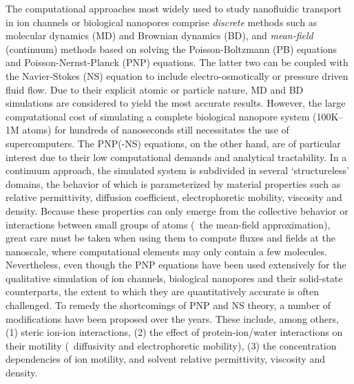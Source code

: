 \documentclass[twoside,twocolumn,9pt]{article}
\begin{document}
The computational approaches most widely used to study nanofluidic transport in ion channels or biological
nanopores comprise \emph{discrete} methods such as molecular dynamics
(MD)\cite{Lynden-Bell-1996,Allen-1999,Aksimentiev-2005,Luan-2008,Bhattacharya-2011,Zhang-2014,DiMarino-2015,Belkin-2016}
and Brownian dynamics
(BD),\cite{Schirmer-1999,Im-2002,Noskov-2004,Millar-2008,Egwolf-2010,DeBiase-2015,Pederson-2015} and
\emph{mean-field} (continuum) methods based on solving the Poisson-Boltzmann (PB)
equations\cite{Grochowski-2008, Baldessari-2008-1} and Poisson-Nernst-Planck (PNP)
equations.\cite{Eisenberg-1996,Gillespie-2002, Simakov-2010} The latter two can be coupled with the
Navier-Stokes (NS) equation to include electro-osmotically or pressure driven fluid
flow.\cite{Lu-2012,Pederson-2015} Due to their explicit atomic or particle nature, MD and BD simulations are
considered to yield the most accurate results. However, the large computational cost of simulating a complete
biological nanopore system (100K--1M atoms) for hundreds of nanoseconds still necessitates the use of
supercomputers.\cite{Aksimentiev-2005,Bhattacharya-2011,Wilson-2019} The PNP(-NS) equations, on the other
hand, are of particular interest due to their low computational demands and analytical tractability. In a
continuum approach, the simulated system is subdivided in several `structureless' domains, the behavior of
which is parameterized by material properties such as relative permittivity, diffusion coefficient,
electrophoretic mobility, viscosity and density. Because these properties can only emerge from the collective
behavior or interactions between small groups of atoms (\ie~the mean-field approximation), great care must be
taken when using them to compute fluxes and fields at the nanoscale, where computational elements may only
contain a few molecules.\cite{Corry-2000,Collins-2012} Nevertheless, even though the PNP equations have been
used extensively for the qualitative simulation of ion channels,\cite{Im-2002,Furini-2006,Liu-2015} biological
nanopores\cite{Simakov-2010,Pederson-2015,Aguilella-Arzo-2017,Simakov-2018} and their solid-state
counterparts,\cite{Cervera-2005,White-2008,Chaudhry-2014,Laohakunakorn-2015} the extent to which they are
quantitatively accurate is often challenged.\cite{Corry-2000,Collins-2012,Maffeo-2012,Thomas-2014,Kim-2015}
To remedy the shortcomings of PNP and NS theory, a number of modifications have been proposed over the years.
These include, among others, (1) steric ion-ion interactions, (2) the effect of protein-ion/water interactions
on their motility (\ie~diffusivity and electrophoretic mobility), (3) the concentration dependencies of ion
motility, and solvent relative permittivity, viscosity and density.
\end{document}
